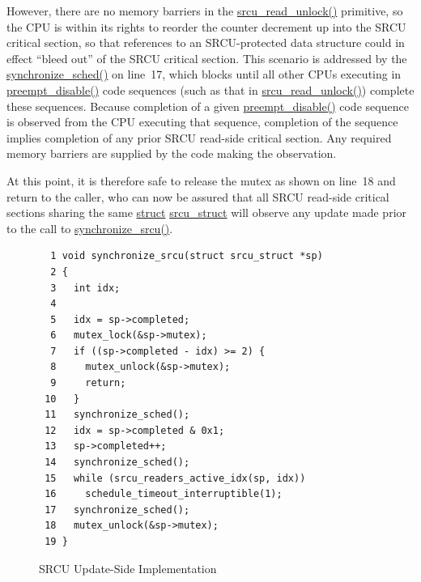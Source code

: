 However, there are no memory barriers in the \url{srcu_read_unlock()}
primitive, so the CPU is within its rights to reorder the counter
decrement up into the SRCU critical section, so that references to
an SRCU-protected data structure could in effect ``bleed out'' of the
SRCU critical section.
This scenario is addressed by the \url{synchronize_sched()} on line~17,
which blocks until all other CPUs executing in \url{preempt_disable()}
code sequences (such as that in \url{srcu_read_unlock()}) complete these
sequences.
Because completion of a given \url{preempt_disable()} code sequence
is observed from the CPU executing that sequence, completion of the
sequence implies completion of any prior SRCU read-side critical section.
Any required memory barriers are supplied by the code making the
observation.

At this point, it is therefore safe to release the mutex as shown
on line~18 and return to the caller, who can now be assured that
all SRCU read-side critical sections sharing the same
\url{struct} \url{srcu_struct}
will observe any update made prior to the call to \url{synchronize_srcu()}.

\begin{figure}[htbp]
{ \scriptsize
\begin{verbatim}
  1 void synchronize_srcu(struct srcu_struct *sp)
  2 {
  3   int idx;
  4 
  5   idx = sp->completed;
  6   mutex_lock(&sp->mutex);
  7   if ((sp->completed - idx) >= 2) {
  8     mutex_unlock(&sp->mutex);
  9     return;
 10   }
 11   synchronize_sched();
 12   idx = sp->completed & 0x1;
 13   sp->completed++;
 14   synchronize_sched();
 15   while (srcu_readers_active_idx(sp, idx))
 16     schedule_timeout_interruptible(1);
 17   synchronize_sched();
 18   mutex_unlock(&sp->mutex);
 19 }
\end{verbatim}
}
\caption{SRCU Update-Side Implementation}
\label{fig:app:rcuimpl:Update-Side Implementation}
\end{figure}

 \QuickQuizEnd


